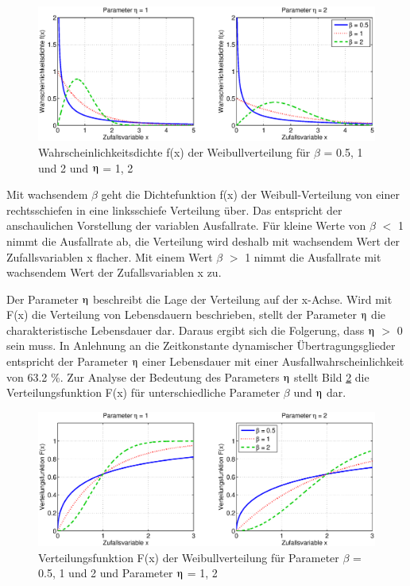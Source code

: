 \begin{figure}[H]
  \centerline{\includegraphics[width=1\textwidth]{Kapitel4/Bilder/image26}}
  \caption{Wahrscheinlichkeitsdichte f(x) der Weibullverteilung f\"{u}r $\beta$ = 0.5, 1 und 2 und $\etaup$ = 1, 2}
  \label{fig:Stetig_Weibull1}
\end{figure}

\noindent Mit wachsendem $\beta$ geht die Dichtefunktion f(x) der Weibull-Verteilung von einer rechtsschiefen in eine linksschiefe Verteilung \"{u}ber. Das entspricht der anschaulichen Vorstellung der variablen Ausfallrate. F\"{u}r kleine Werte von $\beta$ $\mathrm{<}$ 1 nimmt die Ausfallrate ab, die Verteilung wird deshalb mit wachsendem Wert der Zufallsvariablen x flacher. Mit einem Wert $\beta$ $\mathrm{>}$ 1 nimmt die Ausfallrate mit wachsendem Wert der Zufallsvariablen x zu.\newline 

\noindent Der Parameter $\etaup$ beschreibt die Lage der Verteilung auf der x-Achse. Wird mit F(x) die Verteilung von Lebensdauern beschrieben, stellt der Parameter $\etaup$ die charakteristische Lebensdauer dar. Daraus ergibt sich die Folgerung, dass $\etaup$ $\mathrm{>}$ 0 sein muss. In Anlehnung an die Zeitkonstante dynamischer \"{U}bertragungsglieder entspricht der Parameter $\etaup$ einer Lebensdauer mit einer Ausfallwahrscheinlichkeit von 63.2 \%. Zur Analyse der Bedeutung des Parameters $\etaup$ stellt Bild \ref{fig:Stetig_Weibull2} die Verteilungsfunktion F(x) f\"{u}r unterschiedliche Parameter $\beta$ und $\etaup$ dar.

\begin{figure}[H]
  \centerline{\includegraphics[width=1\textwidth]{Kapitel4/Bilder/image27}}
  \caption{Verteilungsfunktion F(x) der Weibullverteilung f\"{u}r Parameter $\beta$ = 0.5, 1 und 2 und Parameter $\etaup$ = 1, 2 }
  \label{fig:Stetig_Weibull2}
\end{figure}

